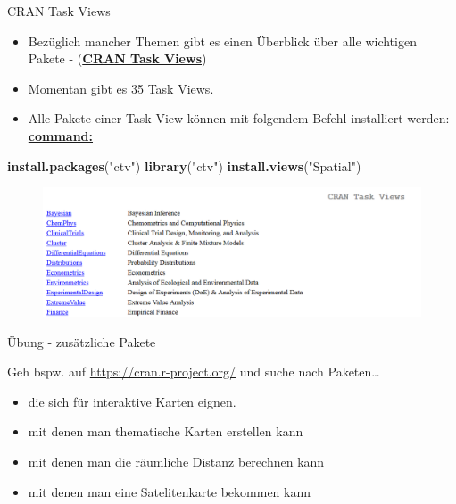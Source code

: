 \documentclass[ignorenonframetext,]{beamer}
\newenvironment{Shaded}{\begin{snugshade}}{\end{snugshade}}
\newcommand{\KeywordTok}[1]{\textcolor[rgb]{0.26,0.66,0.93}{\textbf{#1}}}
\newcommand{\StringTok}[1]{\textcolor[rgb]{0.02,0.61,0.04}{#1}}
\newcommand{\NormalTok}[1]{\textcolor[rgb]{0.74,0.68,0.62}{#1}}
\providecommand{\tightlist}{%
  \setlength{\itemsep}{0pt}\setlength{\parskip}{0pt}}
\begin{document}
\begin{frame}[fragile]{CRAN Task Views}

\begin{itemize}
\tightlist
\item
  Bezüglich mancher Themen gibt es einen Überblick über alle wichtigen
  Pakete - (\href{https://cran.r-project.org/web/views/}{\textbf{CRAN
  Task Views}})
\item
  Momentan gibt es 35 Task Views.
\item
  Alle Pakete einer Task-View können mit folgendem Befehl installiert
  werden:
  \href{https://mran.microsoft.com/rpackages/}{\textbf{command:}}
\end{itemize}

\begin{Shaded}
\begin{Highlighting}[]
\KeywordTok{install.packages}\NormalTok{(}\StringTok{"ctv"}\NormalTok{)}
\KeywordTok{library}\NormalTok{(}\StringTok{"ctv"}\NormalTok{)}
\KeywordTok{install.views}\NormalTok{(}\StringTok{"Spatial"}\NormalTok{)}
\end{Highlighting}
\end{Shaded}

\begin{figure}
\centering
\includegraphics{figure/CRANtaskViews.PNG}
\caption{}
\end{figure}

\end{frame}

\begin{frame}{Übung - zusätzliche Pakete}

Geh bspw. auf \url{https://cran.r-project.org/} und suche nach
Paketen\ldots{}

\begin{itemize}
\tightlist
\item
  die sich für interaktive Karten eignen.
\item
  mit denen man thematische Karten erstellen kann
\item
  mit denen man die räumliche Distanz berechnen kann
\item
  mit denen man eine Satelitenkarte bekommen kann
\end{itemize}

\end{frame}
\end{document}
